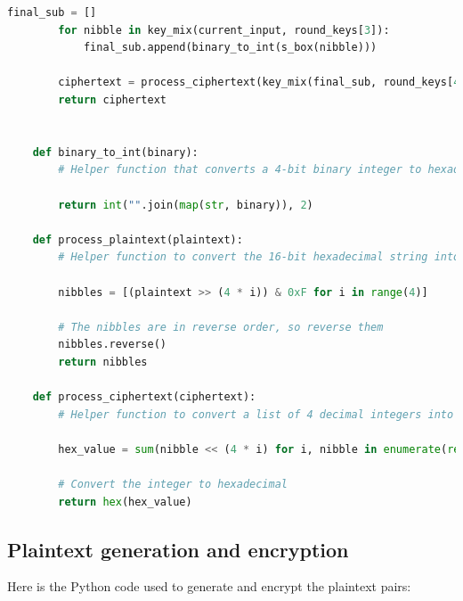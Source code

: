 \documentclass[letterpaper,12pt]{article}
\begin{document}
\begin{lstlisting}[language=Python, caption=Python code for SPN (spn.py), label=lts:spn]
        final_sub = []
        for nibble in key_mix(current_input, round_keys[3]):
            final_sub.append(binary_to_int(s_box(nibble)))
        
        ciphertext = process_ciphertext(key_mix(final_sub, round_keys[4]))
        return ciphertext
        
            
    def binary_to_int(binary):
        # Helper function that converts a 4-bit binary integer to hexadecimal

        return int("".join(map(str, binary)), 2)

    def process_plaintext(plaintext):
        # Helper function to convert the 16-bit hexadecimal string into a list of 4 decimal integers

        nibbles = [(plaintext >> (4 * i)) & 0xF for i in range(4)]

        # The nibbles are in reverse order, so reverse them
        nibbles.reverse()
        return nibbles

    def process_ciphertext(ciphertext):
        # Helper function to convert a list of 4 decimal integers into a hexadecimal string

        hex_value = sum(nibble << (4 * i) for i, nibble in enumerate(reversed(ciphertext)))

        # Convert the integer to hexadecimal
        return hex(hex_value)
    \end{lstlisting}

\subsection*{Plaintext generation and encryption}
Here is the Python code used to generate and encrypt the plaintext pairs:
\end{document}
